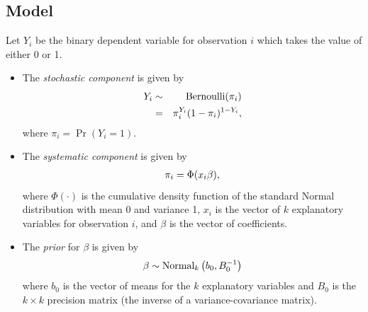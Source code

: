 \documentclass[letterpaper,10pt,english]{sphinxmanual}
\begin{document}
\subsection{Model}
\label{vignette:id104}
Let \(Y_{i}\) be the binary dependent variable for observation
\(i\) which takes the value of either 0 or 1.
\begin{itemize}
\item {} 
The \emph{stochastic component} is given by
\begin{gather}
\begin{split}\begin{aligned}
Y_{i}  &  \sim & \textrm{Bernoulli}(\pi_{i})\\
&  = & \pi_{i}^{Y_{i}}(1-\pi_{i})^{1-Y_{i}},\end{aligned}\end{split}\notag
\end{gather}
where \(\pi_{i}=\Pr(Y_{i}=1)\).

\item {} 
The \emph{systematic component} is given by
\begin{gather}
\begin{split}\begin{aligned}
\pi_{i}= \Phi(x_i \beta),\end{aligned}\end{split}\notag
\end{gather}
where \(\Phi(\cdot)\) is the cumulative density function of the
standard Normal distribution with mean 0 and variance 1,
\(x_{i}\) is the vector of \(k\) explanatory variables for
observation \(i\), and \(\beta\) is the vector of
coefficients.

\item {} 
The \emph{prior} for \(\beta\) is given by
\begin{gather}
\begin{split}\begin{aligned}
\beta \sim \textrm{Normal}_k \left(  b_{0}, B_{0}^{-1} \right)\end{aligned}\end{split}\notag
\end{gather}
where \(b_{0}\) is the vector of means for the \(k\)
explanatory variables and \(B_{0}\) is the \(k \times k\)
precision matrix (the inverse of a variance-covariance matrix).

\end{itemize}
\end{document}
